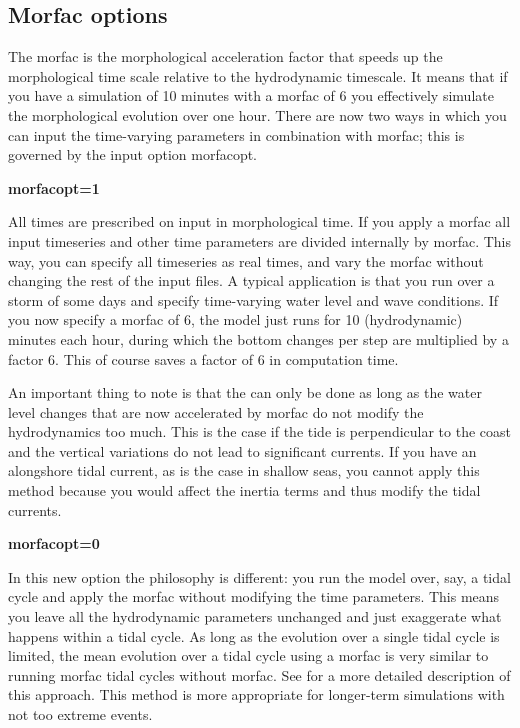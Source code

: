 \subsection{ Morfac options}

The morfac is the morphological acceleration factor that speeds up the morphological time scale relative to the hydrodynamic timescale. It means that if you have a simulation of 10 minutes with a morfac of 6 you effectively simulate the morphological evolution over one hour. There are now two ways in which you can input the time-varying parameters in combination with morfac; this is governed by the input option morfacopt.

\textbf{morfacopt=1} 

All times are prescribed on input in morphological time. If you apply a morfac all input timeseries and other time parameters are divided internally by morfac. This way, you can specify all timeseries as real times, and vary the morfac without changing the rest of the input files. A typical application is that you run over a storm of some days and specify time-varying water level and wave conditions. If you now specify a morfac of 6, the model just runs for 10 (hydrodynamic) minutes each hour, during which the bottom changes per step are multiplied by a factor 6. This of course saves a factor of 6 in computation time.

An important thing to note is that the can only be done as long as the water level changes that are now accelerated by morfac do not modify the hydrodynamics too much. This is the case if the tide is perpendicular to the coast and the vertical variations do not lead to significant currents. If you have an alongshore tidal current, as is the case in shallow seas, you cannot apply this method because you would affect the inertia terms and thus modify the tidal currents.

\textbf{morfacopt=0}

In this new option the philosophy is different: you run the model over, say, a tidal cycle and apply the morfac without modifying the time parameters. This means you leave all the hydrodynamic parameters unchanged and just exaggerate what happens within a tidal cycle. As long as the evolution over a single tidal cycle is limited, the mean evolution over a tidal cycle using a morfac is very similar to running morfac tidal cycles without morfac. See \citet{Roelvink2006} for a more detailed description of this approach. This method is more appropriate for longer-term simulations with not too extreme events.

